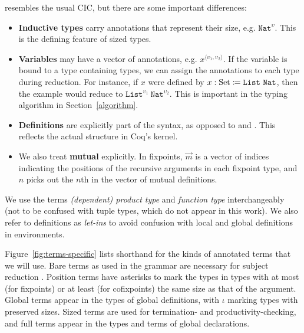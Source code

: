 \documentclass[sigplan,10pt,anonymous,review,nonacm]{acmart}
\begin{document}
\lang resembles the usual CIC, but there are some important differences:

\begin{itemize}
    \item \textbf{Inductive types} carry annotations that represent their size, e.g. $\texttt{Nat}^\upsilon$. This is the defining feature of sized types.
    \item \textbf{Variables} may have a vector of annotations, e.g. $x^{\langle \upsilon_1, \upsilon_2 \rangle}$. If the variable is bound to a type containing \coinductive types, we can assign the annotations to each \coinductive type during reduction. For instance, if $x$ were defined by $x : \text{Set} \coloneqq \texttt{List}\ \texttt{Nat}$, then the example would reduce to $\texttt{List}^{\upsilon_1}\ \texttt{Nat}^{\upsilon_2}$. This is important in the typing algorithm in Section~\ref{algorithm}.
    \item \textbf{Definitions} are explicitly part of the syntax, as opposed to \CIChat and \CIChatbar \cite{cic-hat-bar}. This reflects the actual structure in Coq's kernel.
    \item We also treat \textbf{mutual \cofixpoints} explicitly. In fixpoints, $\vec{m}$ is a vector of indices indicating the positions of the recursive arguments in each fixpoint type, and $n$ picks out the $n$th \cofixpoint in the vector of mutual definitions.
\end{itemize}

We use the terms \textit{(dependent) product type} and \textit{function type} interchangeably (not to be confused with tuple types, which do not appear in this work). We also refer to definitions as \textit{let-ins} to avoid confusion with local and global definitions in environments.

\begin{comment}
The simplicity of the size algebra of $S$, with only the successor operation $\widehat{\cdot}$, allows for easy and efficient size inference. We elaborate on this in Section~\ref{algorithm}.
\end{comment}



Figure~\ref{fig:terms-specific} lists shorthand for the kinds of annotated terms that we will use. Bare terms as used in the grammar are necessary for subject reduction \cite{cic-hat-bar}. Position terms have asterisks to mark the types in \cofixpoint types with at most (for fixpoints) or at least (for cofixpoints) the same size as that of the \corecursive argument. Global terms appear in the types of global definitions, with $\iota$ marking types with preserved sizes. Sized terms are used for termination- and productivity-checking, and full terms appear in the types and terms of global declarations.
\end{document}

